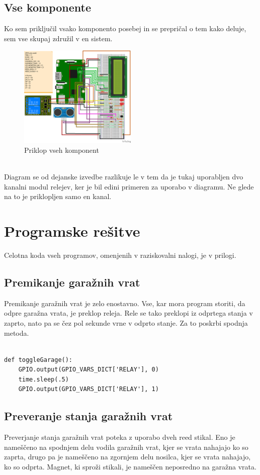 \documentclass[11pt]{article}
\begin{document}
\subsection{Vse komponente}
Ko sem priključil vsako komponento posebej in se prepričal o tem kako deluje, sem vse skupaj združil v en sistem.
\begin{figure}[h]
\centering
\includegraphics[width=0.5\textwidth]{images/smartGarageComplete_bb.png}
\caption{Priklop vseh komponent}
\end{figure}\\
Diagram se od dejanske izvedbe razlikuje le v tem da je tukaj uporabljen dvo kanalni modul relejev, ker je bil edini primeren za uporabo v diagramu. Ne glede na to je priklopljen samo en kanal.

\section{Programske rešitve}
Celotna koda vseh programov, omenjenih v raziskovalni nalogi, je v prilogi.
\subsection{Premikanje garažnih vrat}
Premikanje garažnih vrat je zelo enostavno. Vse, kar mora program storiti, da odpre garažna vrata, je preklop releja. Rele se tako preklopi iz odprtega stanja v zaprto, nato pa se čez pol sekunde vrne v odprto stanje. Za to poskrbi spodnja metoda.
\begin{verbatim}

def toggleGarage():
    GPIO.output(GPIO_VARS_DICT['RELAY'], 0)
    time.sleep(.5)
    GPIO.output(GPIO_VARS_DICT['RELAY'], 1)
\end{verbatim}
\subsection{Preveranje stanja garažnih vrat}
Preverjanje stanja garažnih vrat poteka z uporabo dveh reed stikal. Eno je nameščeno na spodnjem delu vodila garažnih vrat, kjer se vrata nahajajo ko so zaprta, drugo pa je nameščeno na zgornjem delu nosilca, kjer se vrata nahajajo, ko so odprta. Magnet, ki sproži stikali, je nameščen neposredno na garažna vrata.
\end{document}
